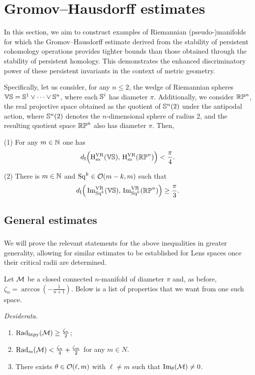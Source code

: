 
\section{Gromov--Hausdorff estimates}\label{s:gh_estimates}

In this section, we aim to construct examples of Riemannian (pseudo-)manifolds for which the Gromov--Hausdorff estimate derived from the stability of persistent cohomology operations provides tighter bounds than those obtained through the stability of persistent homology.
This demonstrates the enhanced discriminatory power of these persistent invariants in the context of metric geometry.

Specifically, let us consider, for any \(n \leq 2\), the wedge of Riemannian spheres \(\mathbb{VS} = \mathbb{S}^1 \vee \dots \vee \mathbb{S}^n\), where each \(\mathbb{S}^i\) has diameter \(\pi\).
Additionally, we consider \(\mathbb{RP}^n\), the real projective space obtained as the quotient of \(\mathbb{S}^n(2)\) under the antipodal action, where \(\mathbb{S}^n(2)\) denotes the \(n\)-dimensional sphere of radius 2, and the resulting quotient space \(\mathbb{RP}^n\) also has diameter \(\pi\).
Then,

\medskip (1) For any \(m \in \mathbb{N}\) one has
\[
d_{\mathrm{I}}\Big(\mathrm{H}^{\mathrm{VR}}_m(\mathbb{VS}),\, \mathrm{H}^{\mathrm{VR}}_m(\mathbb{RP}^n)\Big) < \frac{\pi}{4}.
\]

(2) There is \(m \in \mathbb{N}\) and \(\mathrm{Sq}^k \in \mathcal{O}(m-k, m)\) such that
\[
d_{\mathrm{I}}\Big(\operatorname{Im}_{\mathrm{Sq}^k}^{\mathrm{VR}}(\mathbb{VS}),\, \operatorname{Im}_{\mathrm{Sq}^k}^{\mathrm{VR}}(\mathbb{RP}^n)\Big) \geq \frac{\pi}{3}.
\]

\subsection{General estimates}\label{ss:genberal_distance_comparison}

\subsubsection{}

We will prove the relevant statements for the above inequalities in greater generality, allowing for similar estimates to be established for Lens spaces once their critical radii are determined.

Let $\mathcal{M}$ be a closed connected \(n\)-manifold of diameter $\pi$ and, as before, $\zeta_n = \arccos{(-\tfrac{1}{n+1})}$.
Below is a list of properties that we want from one such space.

\medskip\noindent\textit{\darkblue Desiderata}.\
\begin{enumerate}
    \item $\mathrm{Rad}_{\mathrm{htpy}}(\mathcal{M}) \geq \tfrac{\zeta_n}{2} $;
    \item $\mathrm{Rad}_{m}(\mathcal{M}) < \tfrac{\zeta_n}{4}+\tfrac{\zeta_m}{2}$ for any $m \in N$.
    \item There exists $\theta \in \mathcal{O}(\ell, m)$ with \(\ell \neq m\) such that $\operatorname{Im}_\theta(\mathcal{M}) \neq 0$.
\end{enumerate}

